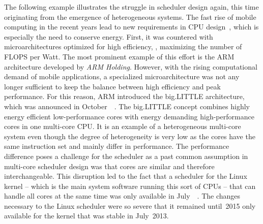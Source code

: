 The following example illustrates the struggle in scheduler design again, this time originating from the emergence of heterogeneous systems. The fast rise of mobile computing in the recent years lead to new requirements in CPU design~\cite{McGregor-2009-EvolutionMobile}, which is especially the need to conserve energy. First, it was countered with microarchitectures optimized for high efficiency, \eg{}, maximizing the number of \ac{FLOPS} per Watt. The most prominent example of this effort is the ARM architecture developed by \emph{ARM Holding}. However, with the rising computational demand of mobile applications, a specialized microarchitecture was not any longer sufficient to keep the balance between high efficiency and peak performance. For this reason, ARM introduced the big.LITTLE architecture, which was announced in October~\citeyear{ARM-2011-BigLittle}~\cite{ARM-2011-BigLittle}. The big.LITTLE concept combines highly energy efficient low-performance cores with energy demanding high-performance cores in one multi-core CPU. It is an example of a heterogeneous multi-core system even though the degree of heterogeneity is very low as the cores have the same instruction set and mainly differ in performance. The performance difference poses a challenge for the scheduler as a past common assumption in multi-core scheduler design was that cores are similar and therefore interchangeable. This disruption led to the fact that a scheduler for the Linux kernel -- which is the main system software running this sort of CPUs -- that can handle all cores at the same time was only available in July~\citeyear{Grey-2013-GTS}~\cite{Grey-2013-GTS}. The changes necessary to the Linux scheduler were so severe that it remained until~2015 only available for the kernel that was stable in July~2013.


